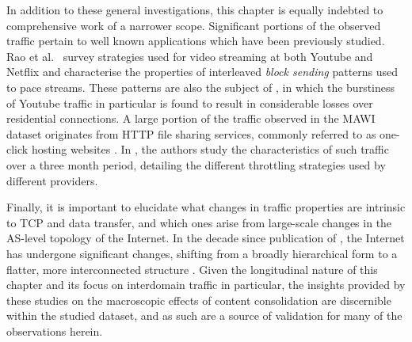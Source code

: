 In addition to these general investigations, this chapter is equally indebted to comprehensive work of a narrower scope.
Significant portions of the observed traffic pertain to well known applications which have been previously studied.
Rao et al.\ \cite{Rao:2011p547} survey strategies used for video streaming at both Youtube and Netflix and characterise the properties of interleaved \emph{block sending} patterns used to pace streams.
These patterns are also the subject of \cite{Alcock:2011p575}, in which the burstiness of Youtube traffic in particular is found to result in considerable losses over residential connections.
A large portion of the traffic observed in the \acs{MAWI} dataset originates from \ac{HTTP} file sharing services, commonly referred to as one-click hosting websites \cite{oneclick1}.
In \cite{SanjuasCuxart:2012p588}, the authors study the characteristics of such traffic over a three month period, detailing the different throttling strategies used by different providers.

Finally, it is important to elucidate what changes in traffic properties are intrinsic to \ac{TCP} and data transfer, and which ones arise from large-scale changes in the \ac{AS}-level topology of the Internet. 
In the decade since publication of \cite{Zhang:2002p85}, the Internet has undergone significant changes, shifting from a broadly hierarchical form to a flatter, more interconnected structure \cite{Labovitz:2010p175,Ager:2012p567}.
Given the longitudinal nature of this chapter and its focus on interdomain traffic in particular, the insights provided by these studies on the macroscopic effects of content consolidation are discernible within the studied dataset, and as such are a source of validation for many of the observations herein.
